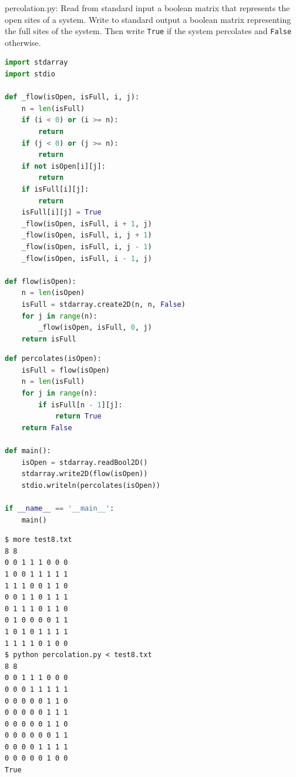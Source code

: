 \documentclass[8pt,a4paper,compress,handout]{beamer}
\begin{document}
\begin{frame}[fragile]
\begin{framed}
\tiny percolation.py: Read from standard input a boolean matrix that represents the open sites of a system. Write to standard output a boolean
matrix representing the full sites of the system. Then write \lstinline{True} if the system percolates and \lstinline{False} otherwise.

\end{framed}

\begin{lstlisting}[language=Python]
import stdarray
import stdio

def _flow(isOpen, isFull, i, j):
    n = len(isFull)
    if (i < 0) or (i >= n):
        return
    if (j < 0) or (j >= n):
        return
    if not isOpen[i][j]:
        return
    if isFull[i][j]:
        return
    isFull[i][j] = True
    _flow(isOpen, isFull, i + 1, j)
    _flow(isOpen, isFull, i, j + 1)
    _flow(isOpen, isFull, i, j - 1)
    _flow(isOpen, isFull, i - 1, j)

def flow(isOpen):
    n = len(isOpen)
    isFull = stdarray.create2D(n, n, False)
    for j in range(n):
        _flow(isOpen, isFull, 0, j)
    return isFull
\end{lstlisting}
\end{frame}

\begin{frame}[fragile]
\begin{lstlisting}[language=Python]
def percolates(isOpen):
    isFull = flow(isOpen)
    n = len(isFull)
    for j in range(n):
        if isFull[n - 1][j]:
            return True
    return False

def main():
    isOpen = stdarray.readBool2D()
    stdarray.write2D(flow(isOpen))
    stdio.writeln(percolates(isOpen))

if __name__ == '__main__':
    main()
\end{lstlisting}
\end{frame}

\begin{frame}[fragile]
\begin{lstlisting}[language={}]
$ more test8.txt 
8 8
0 0 1 1 1 0 0 0
1 0 0 1 1 1 1 1
1 1 1 0 0 1 1 0
0 0 1 1 0 1 1 1
0 1 1 1 0 1 1 0
0 1 0 0 0 0 1 1
1 0 1 0 1 1 1 1
1 1 1 1 0 1 0 0
$ python percolation.py < test8.txt 
8 8
0 0 1 1 1 0 0 0 
0 0 0 1 1 1 1 1 
0 0 0 0 0 1 1 0 
0 0 0 0 0 1 1 1 
0 0 0 0 0 1 1 0 
0 0 0 0 0 0 1 1 
0 0 0 0 1 1 1 1 
0 0 0 0 0 1 0 0 
True
\end{lstlisting}
\end{frame}
\end{document}
